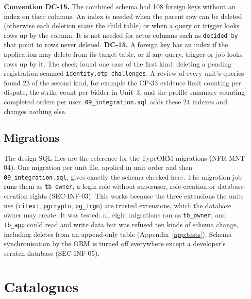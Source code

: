 \documentclass[11pt,a4paper]{article}
\begin{document}
\textbf{Convention DC-15.} The combined schema had 108 foreign keys without an index on their columns. An index is needed when the parent row can be deleted (otherwise each deletion scans the child table) or when a query or trigger looks rows up by the column. It is not needed for actor columns such as \texttt{decided\_by} that point to rows never deleted. \textbf{DC-15.} A foreign key has an index if the application may delete from its target table, or if any query, trigger or job looks rows up by it. The check found one case of the first kind: deleting a pending registration scanned \texttt{identity.\allowbreak otp\_\allowbreak challenges}. A review of every unit's queries found 23 of the second kind, for example the CP-33 evidence limit counting per dispute, the strike count per bidder in Unit~3, and the profile summary counting completed orders per user. \texttt{09\_\allowbreak integration.\allowbreak sql} adds these 24 indexes and changes nothing else.

\subsection{Migrations}
The design SQL files are the reference for the TypeORM migrations (NFR-MNT-04). One migration per unit file, applied in unit order and then \texttt{09\_\allowbreak integration.\allowbreak sql}, gives exactly the schema checked here. The migration job runs them as \texttt{tb\_owner}, a login role without superuser, role-creation or database-creation rights (SEC-INF-03). This works because the three extensions the units use (\texttt{citext}, \texttt{pgcrypto}, \texttt{pg\_trgm}) are trusted extensions, which the database owner may create. It was tested: all eight migrations ran as \texttt{tb\_owner}, and \texttt{tb\_app} could read and write data but was refused ten kinds of schema change, including deletes from an append-only table (Appendix~\ref{app:tests}). Schema synchronisation by the ORM is turned off everywhere except a developer's scratch database (SEC-INF-05).

\section{Catalogues}
\label{sec:catalogues}
\end{document}

